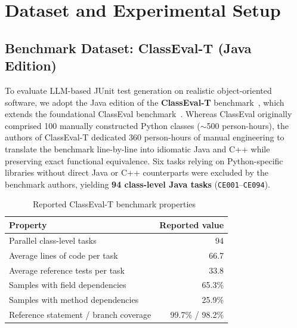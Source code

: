 \section{Dataset and Experimental Setup}
\label{sec:dataset_setup}

\subsection{Benchmark Dataset: ClassEval-T (Java Edition)}
\label{subsec:dataset}
To evaluate LLM-based JUnit test generation on realistic object-oriented software, we adopt the Java edition of the \textbf{ClassEval-T} benchmark~\cite{xue2025classevalt}, which extends the foundational ClassEval benchmark~\cite{du2024classeval}. Whereas ClassEval originally comprised 100 manually constructed Python classes ($\sim$500 person-hours), the authors of ClassEval-T dedicated 360 person-hours of manual engineering to translate the benchmark line-by-line into idiomatic Java and C++ while preserving exact functional equivalence. Six tasks relying on Python-specific libraries without direct Java or C++ counterparts were excluded by the benchmark authors, yielding \textbf{94 class-level Java tasks} (\texttt{CE001}--\texttt{CE094}).

\begin{table}[t]
\centering
\caption{Reported ClassEval-T benchmark properties~\cite{xue2025classevalt}}
\label{tab:benchmark_comparison}
\begin{tabular}{@{}lr@{}}
\toprule
Property & Reported value \\
\midrule
Parallel class-level tasks & 94 \\
Average lines of code per task & 66.7 \\
Average reference tests per task & 33.8 \\
Samples with field dependencies & 65.3\% \\
Samples with method dependencies & 25.9\% \\
Reference statement / branch coverage & 99.7\% / 98.2\% \\
\bottomrule
\end{tabular}
\end{table}

